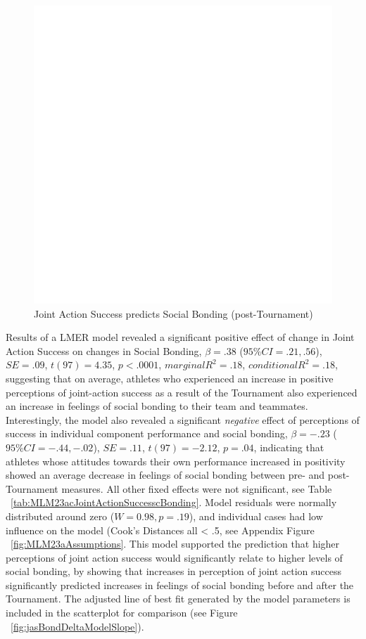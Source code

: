 \begin{figure}[htbp]
  \centering
\includegraphics[scale=.5]{images/jasBondDeltaBasicXY.pdf}
  \caption{Joint Action Success predicts Social Bonding (post-Tournament)}
  \label{fig:jasBondDeltaBasicXY}
\end{figure}


Results of a LMER model revealed a significant positive effect of change in Joint Action Success on changes in Social Bonding, $\beta = .38$ ($95\% CI =  .21, .56$), $SE = .09$, $t(97) = 4.35$, $p < .0001$, $marginal R^2 = .18$, $conditional R^2 = .18$, suggesting that on average, athletes who experienced an increase in positive perceptions of joint-action success as a result of the Tournament also experienced an increase in feelings of social bonding to their team and teammates.  Interestingly, the model also revealed a significant \textit{negative} effect of perceptions of success in individual component performance and social bonding, $\beta = -.23$ ($95\% CI =  -.44, -.02$), $SE = .11$, $t(97) = -2.12$, $p = .04$, indicating that athletes whose attitudes towards their own performance increased in positivity showed an average decrease in feelings of social bonding between pre- and post-Tournament measures. All other fixed effects were not significant, see Table ~\ref{tab:MLM23acJointActionSuccesscBonding}. Model residuals were normally distributed around zero ($W = 0.98, p = .19$), and individual cases had low influence on the model (Cook's Distances all < .5, see Appendix Figure ~\ref{fig:MLM23aAssumptions}.  This model supported the prediction that higher perceptions of joint action success would significantly relate to higher levels of social bonding, by showing that increases in perception of joint action success significantly predicted increases in feelings of social bonding before and after the Tournament.  The adjusted line of best fit generated by the model parameters is included in the scatterplot for comparison (see Figure ~\ref{fig:jasBondDeltaModelSlope}).

